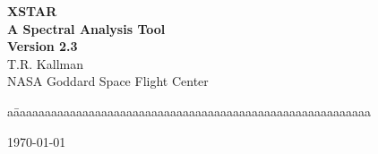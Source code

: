%
%
\oddsidemargin=0.75in
\evensidemargin=0.00in
\textwidth=5.75in
\topmargin=-0.25in
\textheight=8.50in
\topsep=2pt




\begin{titlepage}
\vspace*{2.6in}
\begin{center}
{\LARGE\bf XSTAR}\\
\medskip
{\large\bf A Spectral Analysis Tool}\\
\medskip
{\large\bf Version 2.3}\\
\vskip 1.0cm
{T.R. Kallman}\\
{NASA Goddard Space Flight Center}
\end{center}
\vfill
\bigskip
\begin{tabbing}
a\= aaaaaaaaaaaaaaaaaaaaaaaaaaaaaaaaaaaaaaaaaaaaaaaaaaaaaaaaa\kill
\end{tabbing}
\vfill
\begin{center}
\today
\end{center}
\end{titlepage}
\newpage
\newpage
{}
\tableofcontents








\appendix









%

%


